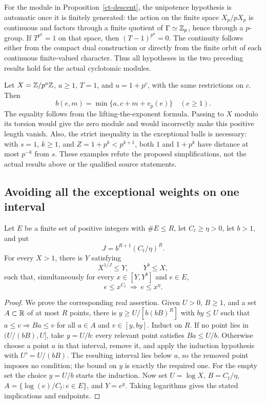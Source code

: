 For the module in Proposition~\ref{ct-descent}, the unipotence
hypothesis is automatic once it is finitely generated: the action
on the finite space $X_p/pX_p$ is continuous and factors through
a finite quotient of $\Gamma\simeq\mathbb Z_p$, hence through a
$p$-group. If $T^{p^a}=1$ on that space, then
$(T-1)^{p^a}=0$. The continuity follows either from the compact
dual construction or directly from the finite orbit of each
continuous finite-valued character. Thus all hypotheses in the
two preceding results hold for the actual cyclotomic modules.

\begin{example}
Let $X=\mathbb Z/p^a\mathbb Z$, $a\ge1$, $T=1$, and $u=1+p^c$, with
the same restrictions on $c$. Then
\[
       b(e,m)=\min\{a,c+m+v_p(e)\}\quad(e\ge1).
\]
The equality follows from the lifting-the-exponent formula.
Passing to $X$ modulo its torsion would give the zero module and
would incorrectly make this positive length vanish. Also, the
strict inequality in the exceptional balls is necessary:
with $s=1$, $k\ge1$, and $Z=1+p^k<p^{k+1}$, both $1$ and $1+p^k$
have distance at most $p^{-k}$ from $s$. These examples refute
the proposed simplifications, not the actual results above or the
qualified source statements.
\end{example}

\subsection{Avoiding all the exceptional weights on one interval}

\begin{lemma}
\label{ct-common-interval}
Let $E$ be a finite set of positive integers with $\#E\le R$,
let $C_t\ge\eta>0$, let $b>1$, and put
\[
             J=b^{R+1}(C_t/\eta)^R.
\]
For every $X>1$, there is $Y$ satisfying
\[
                 X^{1/J}\le Y,\qquad Y^b\le X,
\]
such that, simultaneously for every $x\in[Y,Y^b]$ and $e\in E$,
\[
                     e\le x^{C_t}\ \Longrightarrow\ e\le x^\eta.
\]
\end{lemma}

\begin{proof}
We prove the corresponding real assertion. Given $U>0$, $B\ge1$,
and a set $A\subset\mathbb R$ of at most $R$ points, there is
$y\ge U/[b(bB)^R]$ with $by\le U$ such that
$a\le v\Longrightarrow Ba\le v$ for all $a\in A$ and
$v\in[y,by]$.
Induct on $R$. If no point lies in $(U/(bB),U]$, take $y=U/b$:
every relevant point satisfies $Ba\le U/b$.
Otherwise choose a point $a$ in that interval, remove it, and
apply the induction hypothesis with $U'=U/(bB)$.
The resulting interval lies below $a$, so the removed point
imposes no condition; the bound on $y$ is exactly the required one.
For the empty set the choice $y=U/b$ starts the induction.
Now set $U=\log X$, $B=C_t/\eta$,
$A=\{\log(e)/C_t:e\in E\}$, and $Y=e^y$.
Taking logarithms gives the stated implications and endpoints.
\end{proof}

